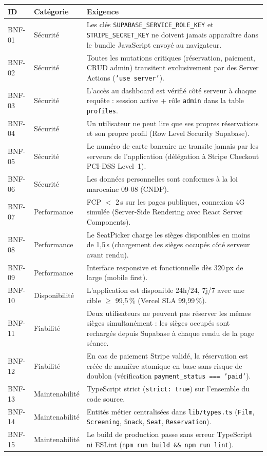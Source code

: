 \documentclass[12pt,a4paper,openany]{report}
\begin{document}
\begin{longtable}{p{1.2cm}lp{8.5cm}}
  \toprule
  \textbf{ID} & \textbf{Catégorie} & \textbf{Exigence} \\
  \midrule
  \endhead
  \bottomrule
  \endfoot

  BNF-01 & Sécurité        & Les clés \texttt{SUPABASE\_SERVICE\_ROLE\_KEY} et \texttt{STRIPE\_SECRET\_KEY} ne doivent jamais apparaître dans le bundle JavaScript envoyé au navigateur. \\[3pt]
  BNF-02 & Sécurité        & Toutes les mutations critiques (réservation, paiement, CRUD admin) transitent exclusivement par des Server Actions (\texttt{'use server'}). \\[3pt]
  BNF-03 & Sécurité        & L'accès au dashboard est vérifié côté serveur à chaque requête : session active + rôle \texttt{admin} dans la table \texttt{profiles}. \\[3pt]
  BNF-04 & Sécurité        & Un utilisateur ne peut lire que ses propres réservations et son propre profil (Row Level Security Supabase). \\[3pt]
  BNF-05 & Sécurité        & Le numéro de carte bancaire ne transite jamais par les serveurs de l'application (délégation à Stripe Checkout PCI-DSS Level~1). \\[3pt]
  BNF-06 & Sécurité        & Les données personnelles sont conformes à la loi marocaine 09-08 (CNDP). \\[3pt]
  BNF-07 & Performance     & FCP $<$ 2\,s sur les pages publiques, connexion 4G simulée (Server-Side Rendering avec React Server Components). \\[3pt]
  BNF-08 & Performance     & Le SeatPicker charge les sièges disponibles en moins de 1,5\,s (chargement des sièges occupés côté serveur avant rendu). \\[3pt]
  BNF-09 & Performance     & Interface responsive et fonctionnelle dès 320\,px de large (mobile first). \\[3pt]
  BNF-10 & Disponibilité   & L'application est disponible 24h/24, 7j/7 avec une cible $\geq$ 99,5\,\% (Vercel SLA 99,99\,\%). \\[3pt]
  BNF-11 & Fiabilité       & Deux utilisateurs ne peuvent pas réserver les mêmes sièges simultanément : les sièges occupés sont rechargés depuis Supabase à chaque rendu de la page séance. \\[3pt]
  BNF-12 & Fiabilité       & En cas de paiement Stripe validé, la réservation est créée de manière atomique en base sans risque de doublon (vérification \texttt{payment\_status === 'paid'}). \\[3pt]
  BNF-13 & Maintenabilité  & TypeScript strict (\texttt{strict: true}) sur l'ensemble du code source. \\[3pt]
  BNF-14 & Maintenabilité  & Entités métier centralisées dans \texttt{lib/types.ts} (\texttt{Film}, \texttt{Screening}, \texttt{Snack}, \texttt{Seat}, \texttt{Reservation}). \\[3pt]
  BNF-15 & Maintenabilité  & Le build de production passe sans erreur TypeScript ni ESLint (\texttt{npm run build \&\& npm run lint}). \\
\end{longtable}
\end{document}
